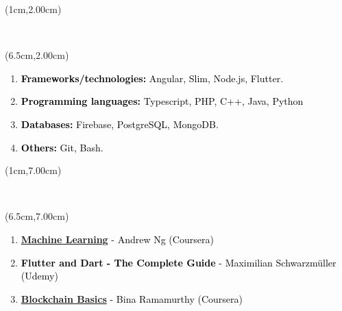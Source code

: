 \documentclass[10pt,a4paper,twocolumn]{article}
\begin{document}
\newpage
\begin{textblock*}{2.5cm}(1cm,2.00cm)
   \begin{mdframed}[style=Frame1]
   \textcolor{white}{\fontsize{20}{20}\selectfont Skills}
   \end{mdframed}
\end{textblock*}
\begin{textblock*}{14cm}(6.5cm,2.00cm)
\begin{enumerate}
    \item \textcolor{black}{\fontsize{14}{20} \selectfont \textbf{Frameworks/technologies:} Angular, Slim, Node.js, Flutter.}
    \item \textcolor{black}{\fontsize{14}{20} \selectfont \textbf{Programming languages:} Typescript, PHP, C++, Java, Python}
    \item \textcolor{black}{\fontsize{14}{20} \selectfont \textbf{Databases:} Firebase, PostgreSQL, MongoDB.}
    \item \textcolor{black}{\fontsize{14}{20} \selectfont \textbf{Others:} Git, Bash.}
\end{enumerate}
\end{textblock*}
\begin{textblock*}{3.50cm}(1cm,7.00cm)
   \begin{mdframed}[style=Frame1]
   \textcolor{white}{\fontsize{20}{20}\selectfont Courses}
   \end{mdframed}
\end{textblock*}
\begin{textblock*}{14cm}(6.5cm,7.00cm)
\begin{enumerate}
    \item \textcolor{black} {\fontsize{14}{20}\selectfont \textbf{\href{https://drive.google.com/drive/folders/1vIvJdWDVqlOQucVfQsaUvrnagXEP9WfX}{Machine Learning}} - Andrew Ng (Coursera) }
    \item \textcolor{black} {\fontsize{14}{20}\selectfont \textbf{Flutter and Dart - The Complete Guide} - Maximilian Schwarzmüller (Udemy)}
    \item \textcolor{black} {\fontsize{14}{20}\selectfont \textbf{\href{https://drive.google.com/drive/folders/1iNJ9KclRptNXeT2hnjGS4JAHuWdt_E-u}{Blockchain Basics}} - Bina Ramamurthy (Coursera) }
\end{enumerate}
\end{textblock*}
\end{document}
